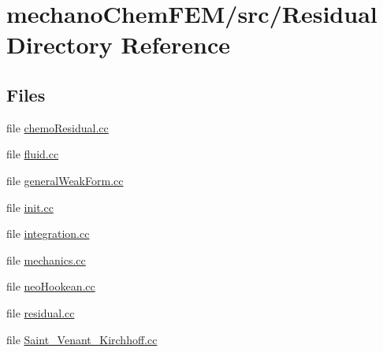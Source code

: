\section{mechano\+Chem\+F\+E\+M/src/\+Residual Directory Reference}
\label{dir_023d627fbb8138760617bfe5d957f0cc}
\subsection*{Files}
\begin{DoxyCompactItemize}
\item 
file \mbox{\hyperlink{chemo_residual_8cc}{chemo\+Residual.\+cc}}
\item 
file \mbox{\hyperlink{fluid_8cc}{fluid.\+cc}}
\item 
file \mbox{\hyperlink{general_weak_form_8cc}{general\+Weak\+Form.\+cc}}
\item 
file \mbox{\hyperlink{init_8cc}{init.\+cc}}
\item 
file \mbox{\hyperlink{integration_8cc}{integration.\+cc}}
\item 
file \mbox{\hyperlink{mechanics_8cc}{mechanics.\+cc}}
\item 
file \mbox{\hyperlink{neo_hookean_8cc}{neo\+Hookean.\+cc}}
\item 
file \mbox{\hyperlink{residual_8cc}{residual.\+cc}}
\item 
file \mbox{\hyperlink{_saint___venant___kirchhoff_8cc}{Saint\+\_\+\+Venant\+\_\+\+Kirchhoff.\+cc}}
\end{DoxyCompactItemize}
